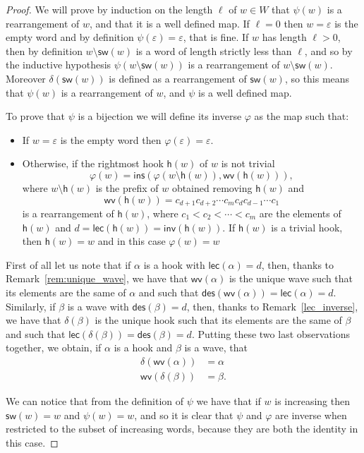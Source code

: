 \documentclass[a4paper]{amsart}
\newcommand{\inv}{\mathsf{inv}}
\newcommand{\des}{\mathsf{des}}
\newcommand{\lec}{\mathsf{lec}}
\newcommand{\sw}{\mathsf{sw}}
\newcommand{\ins}{\mathsf{ins}}
\newcommand{\h}{\mathsf{h}}
\newcommand{\wv}{\mathsf{wv}}
\theoremstyle{definition}
\theoremstyle{remark}
\numberwithin{equation}{section}
\begin{document}
\begin{proof}
We will prove by induction on the length $\ell$ of $w\in W$ that $\psi(w)$ is a rearrangement of $w$, and that it is a well defined map. If $\ell=0$ then $w=\varepsilon$ is the empty word and by definition $\psi(\varepsilon)=\varepsilon$, that is fine. If $w$ has length $\ell>0$, then by definition $w\setminus\sw(w)$ is a word of length strictly less than $\ell$, and so by the inductive hypothesis $\psi(w\setminus\sw(w))$ is a rearrangement of $w\setminus\sw(w)$. Moreover $\delta(\sw(w))$ is defined as a rearrangement of $\sw(w)$, so this means that $\psi(w)$ is a rearrangement of $w$, and $\psi$ is a well defined map.

To prove that $\psi$ is a bijection we will define its inverse $\varphi$ as the map such that:
\begin{itemize}
    \item If $w=\varepsilon$ is the empty word then $\varphi(\varepsilon)=\varepsilon$.
    \item Otherwise, if the rightmost hook $\h(w)$ of $w$ is not trivial
    \begin{equation}
        \varphi(w)=\ins(\varphi(w\setminus \h(w)),\wv(\h(w))),
    \end{equation}
    where $w\setminus \h(w)$ is the prefix of $w$ obtained removing $\h(w)$ and $$\wv(\h(w))=c_{d+1}c_{d+2}\cdots c_mc_dc_{d-1}\cdots c_1$$ is a rearrangement of $\h(w)$, where $c_1<c_2<\cdots<c_m$ are the elements of $\h(w)$ and $d=\lec(\h(w))=\inv(\h(w))$. If $\h(w)$ is a trivial hook, then $\h(w)=w$ and in this case $\varphi(w)=w$
\end{itemize}
First of all let us note that if $\alpha$ is a hook with $\lec(\alpha)=d$, then, thanks to Remark~\ref{rem:unique_wave}, we have that $\wv(\alpha)$ is the unique wave such that its elements are the same of $\alpha$ and such that $\des(\wv(\alpha))=\lec(\alpha)=d$. Similarly, if $\beta$ is a wave with $\des(\beta)=d$, then, thanks to Remark~\ref{lec_inverse}, we have that $\delta(\beta)$ is the unique hook such that its elements are the same of $\beta$ and such that $\lec(\delta(\beta))=\des(\beta)=d$. Putting these two last observations together, we obtain, if $\alpha$ is a hook and $\beta$ is a wave, that
\begin{align}
    \delta(\wv(\alpha))&=\alpha\label{eq:delta_wv}\\
    \wv(\delta(\beta))&=\beta.\label{eq:wv_delta}
\end{align}


We can notice that from the definition of $\psi$ we have that if $w$ is increasing then $\sw(w)=w$ and $\psi(w)=w$, and so it is clear that $\psi$ and $\varphi$ are inverse when restricted to the subset of increasing words, because they are both the identity in this case.


\end{proof}
\end{document}
